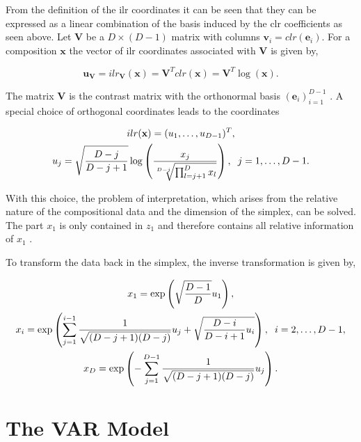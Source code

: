From the definition of the ilr coordinates it can be seen that they can be expressed as a linear combination of the basis induced by the clr coefficients as seen above. Let $\textbf{V}$ be a $D \times (D-1)$ matrix with columns $\textbf{v}_i = clr(\textbf{e}_i)$. For a composition $\textbf{x}$ the vector of ilr coordinates associated with $\textbf{V}$ is given by,

\begin{equation}
\textbf{u}_{\textbf{V}} = ilr_{\textbf{V}}(\textbf{x}) = \textbf{V}^T clr(\textbf{x}) = \textbf{V}^T \log(\textbf{x}). 
\label{eq:ilr coordinates with V}
\end{equation}

The matrix $\textbf{V}$ is the contrast matrix with the orthonormal basis $(\textbf{e}_i)_{i=1}^{D-1}$ \cite{Egozcue:2003}. A special choice of orthogonal coordinates leads to the coordinates 

\begin{gather}
ilr(\textbf{x}) = (u_1,\ldots,u_{D-1})^T, \\
u_j = \sqrt{\frac{D-j}{D-j+1}}\log\left(\frac{x_j}{\sqrt[D-j]{\prod_{l=j+1}^D x_l}}\right), \hspace{0.2cm} j=1,\ldots, D-1.
\label{eq:pivot coordinates}
\end{gather}

With this choice, the problem of interpretation, which arises from the relative nature of the compositional data and the dimension of the simplex, can be solved. The part $x_1$ is only contained in $z_1$ and therefore contains all relative information of $x_1$ \cite{Filzmoser:2020}. 

To transform the data back in the simplex, the inverse transformation is given by, 

\begin{gather}
x_1 = \exp\left(\sqrt{\frac{D-1}{D}}u_1\right), \\
x_i = \exp\left( \sum_{j=1}^{i-1}\frac{1}{\sqrt{(D-j+1)(D-j)}}u_j + \sqrt{\frac{D-i}{D-i+1}u_i} \right), \hspace{0.2cm} i=2,\ldots, D-1, \\
x_D = \exp\left(- \sum_{j=1}^{D-1} \frac{1}{\sqrt{(D-j+1)(D-j)}}u_j \right).
\label{eq: Inverse Transformation}
\end{gather}


\section{The VAR Model}
\label{sec:The VAR Model}

